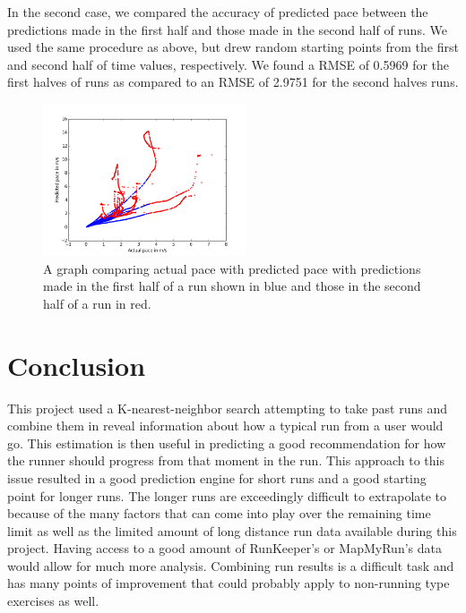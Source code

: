 \documentclass[twoside]{article}
\begin{document}
\begin{multicols}{2}
In the second case, we compared the accuracy of predicted pace between the predictions made in the first half and those made in the second half of runs. We used the same procedure as above, but drew random starting points from the first and second half of time values, respectively. We found a RMSE of 0.5969 for the first halves of runs as compared to an RMSE of 2.9751 for the second halves runs.

\begin{figure}[H]
\begin{center}
\includegraphics[width=6cm]{halves.png}
\caption{A graph comparing actual pace with predicted pace with predictions made in the first half of a run shown in blue and those in the second half of a run in red. }
\end{center}
\end{figure}




\section{Conclusion}

\indent This project used a K-nearest-neighbor search attempting to take past runs and combine them in reveal information about how a typical run from a user would go. This estimation is then useful in predicting a good recommendation for how the runner should progress from that moment in the run. This approach to this issue resulted in a good prediction engine for short runs and a good starting point for longer runs. The longer runs are exceedingly difficult to extrapolate to because of the many factors that can come into play over the remaining time limit as well as the limited amount of long distance run data available during this project. Having access to a good amount of RunKeeper's or MapMyRun's data would allow for much more analysis. Combining run results is a difficult task and has many points of improvement that could probably apply to non-running type exercises as well. \\


\end{multicols}
\end{document}
